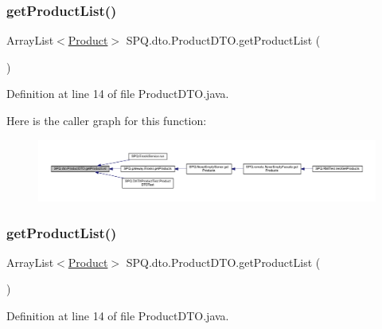 \subsubsection{\texorpdfstring{get\+Product\+List()}{getProductList()}\hspace{0.1cm}{\footnotesize\ttfamily [1/2]}}
{\footnotesize\ttfamily Array\+List$<$\mbox{\hyperlink{class_s_p_q_1_1data_1_1_product}{Product}}$>$ S\+P\+Q.\+dto.\+Product\+D\+T\+O.\+get\+Product\+List (\begin{DoxyParamCaption}{ }\end{DoxyParamCaption})}



Definition at line 14 of file Product\+D\+T\+O.\+java.

Here is the caller graph for this function\+:
\nopagebreak
\begin{figure}[H]
\begin{center}
\leavevmode
\includegraphics[width=350pt]{class_s_p_q_1_1dto_1_1_product_d_t_o_a4b7df5983f4342285d495a335fb9019f_icgraph}
\end{center}
\end{figure}
\mbox{\label{class_s_p_q_1_1dto_1_1_product_d_t_o_a4b7df5983f4342285d495a335fb9019f}} 
\subsubsection{\texorpdfstring{get\+Product\+List()}{getProductList()}\hspace{0.1cm}{\footnotesize\ttfamily [2/2]}}
{\footnotesize\ttfamily Array\+List$<$\mbox{\hyperlink{class_s_p_q_1_1data_1_1_product}{Product}}$>$ S\+P\+Q.\+dto.\+Product\+D\+T\+O.\+get\+Product\+List (\begin{DoxyParamCaption}{ }\end{DoxyParamCaption})}



Definition at line 14 of file Product\+D\+T\+O.\+java.

